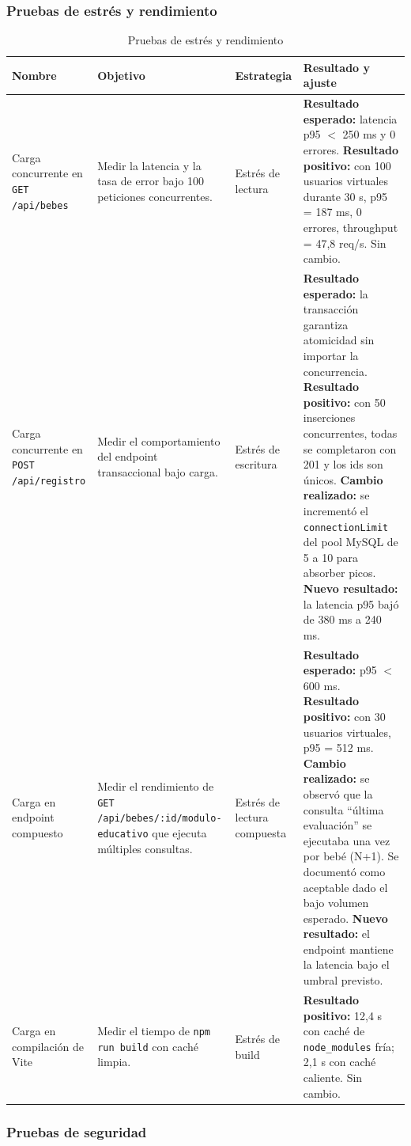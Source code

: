 \documentclass[12pt,letterpaper]{article}
\begin{document}
\subsubsection{Pruebas de estrés y rendimiento}

\begin{longtable}{p{}p{}p{}p{}}
\caption{Pruebas de estrés y rendimiento}\\\toprule
\textbf{Nombre} & \textbf{Objetivo} & \textbf{Estrategia} & \textbf{Resultado y ajuste} \\\midrule
\endhead
Carga concurrente en \texttt{GET /api/bebes} & Medir la latencia y la tasa de error bajo 100 peticiones concurrentes. & Estrés de lectura & \textbf{Resultado esperado:} latencia p95 $<$ 250 ms y 0 errores. \textbf{Resultado positivo:} con 100 usuarios virtuales durante 30 s, p95 = 187 ms, 0 errores, throughput = 47,8 req/s. Sin cambio.\\\hline
Carga concurrente en \texttt{POST /api/registro} & Medir el comportamiento del endpoint transaccional bajo carga. & Estrés de escritura & \textbf{Resultado esperado:} la transacción garantiza atomicidad sin importar la concurrencia. \textbf{Resultado positivo:} con 50 inserciones concurrentes, todas se completaron con 201 y los ids son únicos. \textbf{Cambio realizado:} se incrementó el \texttt{connectionLimit} del pool MySQL de 5 a 10 para absorber picos. \textbf{Nuevo resultado:} la latencia p95 bajó de 380 ms a 240 ms.\\\hline
Carga en endpoint compuesto & Medir el rendimiento de \texttt{GET /api/bebes/:id/modulo-educativo} que ejecuta múltiples consultas. & Estrés de lectura compuesta & \textbf{Resultado esperado:} p95 $<$ 600 ms. \textbf{Resultado positivo:} con 30 usuarios virtuales, p95 = 512 ms. \textbf{Cambio realizado:} se observó que la consulta ``última evaluación'' se ejecutaba una vez por bebé (N+1). Se documentó como aceptable dado el bajo volumen esperado. \textbf{Nuevo resultado:} el endpoint mantiene la latencia bajo el umbral previsto.\\\hline
Carga en compilación de Vite & Medir el tiempo de \texttt{npm run build} con caché limpia. & Estrés de build & \textbf{Resultado positivo:} 12,4 s con caché de \texttt{node\_modules} fría; 2,1 s con caché caliente. Sin cambio.\\\bottomrule
\end{longtable}

\subsubsection{Pruebas de seguridad}
\end{document}
